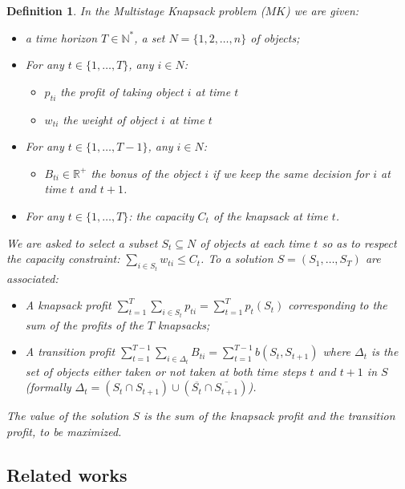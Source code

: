 \documentclass[a4paper]{book}
\newtheorem{definition}{Definition}
\begin{document}
\begin{definition}
In the {\sc Multistage  Knapsack} problem ($MK$) we are given:
\begin{itemize}
\item a time horizon $T \in \mathbb{N}^*$, a set $N=\{1,2,\dots,n\}$ of objects;
\item For any $t \in \{1,\dots,T\}$, any $i\in N$:
\begin{itemize}
\item $p_{ti}$ the profit of taking object $i$ at time $t$
\item $w_{ti}$ the weight of object $i$ at time $t$
\end{itemize} 
\item For any $t \in \{1,\dots,T-1\}$, any $i\in N$:
\begin{itemize}
    \item $B_{ti}  \in \mathbb{R^{+}}$  the bonus of the object $i$ if we keep the same decision for $i$ at time $t$ and $t+1$. 
\end{itemize}
\item For any $t \in \{1,\dots,T\}$: the capacity $C_t$ of the knapsack at time $t$.
\end{itemize}
We are asked to select a subset $S_t\subseteq N$ of objects at each time $t$ so as to respect the capacity constraint: $\sum_{i\in S_t} w_{ti}\leq C_t$. To a solution $S=(S_1,\dots,S_T)$ are associated:
\begin{itemize}
  \item A knapsack profit $\sum\limits_{t=1}^T\sum\limits_{i\in S_t} p_{ti}=\sum\limits_{t=1}^T p_t(S_t)$ corresponding to the sum of the profits of the $T$ knapsacks;
  \item A transition profit $\sum\limits_{t=1} ^ {T-1} \sum\limits_{i \in \Delta_t} B_{ti} = \sum\limits_{t=1}^{T-1}b(S_t,S_{t+1})$ where $\Delta_t$ is the set of objects either taken or not taken at both time steps $t$ and $t+1$ in $S$ (formally $\Delta_t=(S_t\cap S_{t+1})\cup(\overline{S_t}\cap \overline{S_{t+1}})$).
  
\end{itemize} 
The value of the solution $S$ is the sum of the knapsack profit and the transition profit, to be maximized.
\end{definition}




\subsection{Related works}
\end{document}
